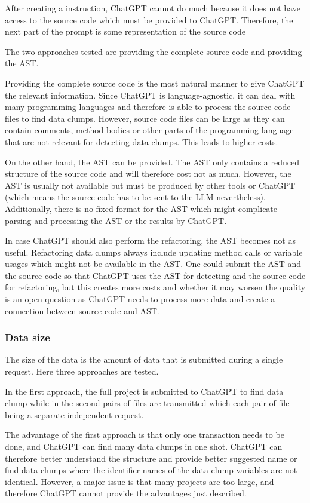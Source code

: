 After creating a instruction, ChatGPT cannot do much because it does not have access to the source code which must be provided to ChatGPT. Therefore, the next part of the prompt is some representation of the source code

The two approaches tested are providing the complete source code and providing the \ac{AST}.

Providing the complete source code is the most natural manner to give ChatGPT the relevant information. Since ChatGPT is language-agnostic, it can deal with many programming languages and therefore is able to process the source code files to find data clumps. However, source code files can be large as they can contain comments, method bodies or other parts of the programming language that are not relevant for detecting data clumps. This leads to higher costs.

On the other hand, the \ac{AST} can be provided. The \ac{AST} only contains a reduced structure of the source code and will therefore cost not as much. However, the \ac{AST} is usually not available but must be produced by other tools or ChatGPT (which means the source code has to be sent to the \ac{LLM} nevertheless). Additionally, there is no fixed format for the \ac{AST} which might complicate parsing and processing the \ac{AST} or the results by ChatGPT.


In case ChatGPT should also perform the refactoring, the \ac{AST} becomes not as useful. Refactoring data clumps always include updating method calls or variable usages which might not be available in the \ac{AST}. One could submit the \ac{AST} and the source code so that ChatGPT uses the \ac{AST} for detecting and the source code for refactoring, but this creates more costs and whether it may worsen the quality is an open question as ChatGPT needs to process more data and create a connection between source code and \ac{AST}.
\subsubsection{Data size}

The size of the data is the amount of data that is submitted during a single request. Here three approaches are tested.

In the first approach, the full project is submitted to ChatGPT to find data clump while in the second pairs of files are transmitted which each pair of file being a separate independent request.

The advantage of the first approach is that only one transaction needs to be done, and ChatGPT can find many data clumps in one shot. ChatGPT can therefore better understand the structure and provide better suggested name or find data clumps where the identifier names of the data clump variables are not identical. However,  a major issue is that many projects are too large, and therefore ChatGPT cannot provide the advantages just described.

